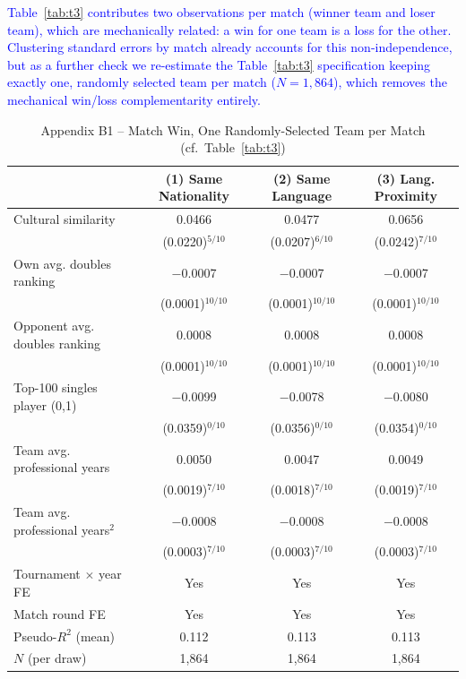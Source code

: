 \documentclass[10pt]{article}
\begin{document}
\textcolor{blue}{Table~\ref{tab:t3} contributes two observations per match (winner team and loser team), which are mechanically related: a win for one team is a loss for the other. Clustering standard errors by match already accounts for this non-independence, but as a further check we re-estimate the Table~\ref{tab:t3} specification keeping exactly one, randomly selected team per match ($N=1{,}864$), which removes the mechanical win/loss complementarity entirely.}

\begin{table}[htbp]
\centering
\caption{Appendix B1 -- Match Win, One Randomly-Selected Team per Match (cf.\ Table~\ref{tab:t3}) \label{tab:b1}}
\begin{threeparttable}
\begin{tabular}{lccc}
\toprule
 & (1) Same Nationality & (2) Same Language & (3) Lang. Proximity \\
\midrule
Cultural similarity & 0.0466 & 0.0477 & 0.0656 \\
 & (0.0220)$^{5/10}$ & (0.0207)$^{6/10}$ & (0.0242)$^{7/10}$ \\
Own avg. doubles ranking & $-$0.0007 & $-$0.0007 & $-$0.0007 \\
 & (0.0001)$^{10/10}$ & (0.0001)$^{10/10}$ & (0.0001)$^{10/10}$ \\
Opponent avg. doubles ranking & 0.0008 & 0.0008 & 0.0008 \\
 & (0.0001)$^{10/10}$ & (0.0001)$^{10/10}$ & (0.0001)$^{10/10}$ \\
Top-100 singles player (0,1) & $-$0.0099 & $-$0.0078 & $-$0.0080 \\
 & (0.0359)$^{0/10}$ & (0.0356)$^{0/10}$ & (0.0354)$^{0/10}$ \\
Team avg. professional years & 0.0050 & 0.0047 & 0.0049 \\
 & (0.0019)$^{7/10}$ & (0.0018)$^{7/10}$ & (0.0019)$^{7/10}$ \\
Team avg. professional years$^2$ & $-$0.0008 & $-$0.0008 & $-$0.0008 \\
 & (0.0003)$^{7/10}$ & (0.0003)$^{7/10}$ & (0.0003)$^{7/10}$ \\
\midrule
Tournament $\times$ year FE & Yes & Yes & Yes \\
Match round FE & Yes & Yes & Yes \\
Pseudo-$R^2$ (mean) & 0.112 & 0.113 & 0.113 \\
$N$ (per draw) & 1,864 & 1,864 & 1,864 \\
\bottomrule
\end{tabular}

\end{threeparttable}
\end{table}
\end{document}
